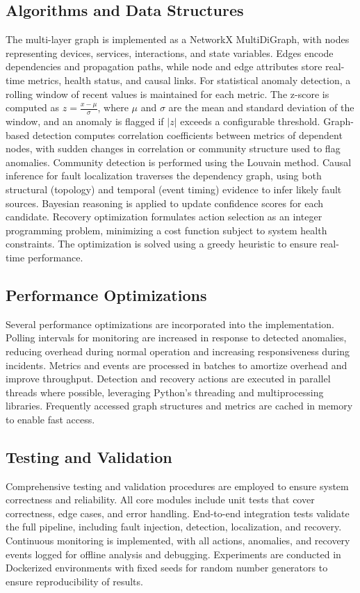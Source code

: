 \documentclass[11pt,twocolumn]{article}
\begin{document}
\subsection{Algorithms and Data Structures}
The multi-layer graph is implemented as a NetworkX MultiDiGraph, with nodes representing devices, services, interactions, and state variables. Edges encode dependencies and propagation paths, while node and edge attributes store real-time metrics, health status, and causal links. For statistical anomaly detection, a rolling window of recent values is maintained for each metric. The z-score is computed as $z = \frac{x - \mu}{\sigma}$, where $\mu$ and $\sigma$ are the mean and standard deviation of the window, and an anomaly is flagged if $|z|$ exceeds a configurable threshold. Graph-based detection computes correlation coefficients between metrics of dependent nodes, with sudden changes in correlation or community structure used to flag anomalies. Community detection is performed using the Louvain method. Causal inference for fault localization traverses the dependency graph, using both structural (topology) and temporal (event timing) evidence to infer likely fault sources. Bayesian reasoning is applied to update confidence scores for each candidate. Recovery optimization formulates action selection as an integer programming problem, minimizing a cost function subject to system health constraints. The optimization is solved using a greedy heuristic to ensure real-time performance.

\subsection{Performance Optimizations}
Several performance optimizations are incorporated into the implementation. Polling intervals for monitoring are increased in response to detected anomalies, reducing overhead during normal operation and increasing responsiveness during incidents. Metrics and events are processed in batches to amortize overhead and improve throughput. Detection and recovery actions are executed in parallel threads where possible, leveraging Python's threading and multiprocessing libraries. Frequently accessed graph structures and metrics are cached in memory to enable fast access.

\subsection{Testing and Validation}
Comprehensive testing and validation procedures are employed to ensure system correctness and reliability. All core modules include unit tests that cover correctness, edge cases, and error handling. End-to-end integration tests validate the full pipeline, including fault injection, detection, localization, and recovery. Continuous monitoring is implemented, with all actions, anomalies, and recovery events logged for offline analysis and debugging. Experiments are conducted in Dockerized environments with fixed seeds for random number generators to ensure reproducibility of results.
\end{document}
